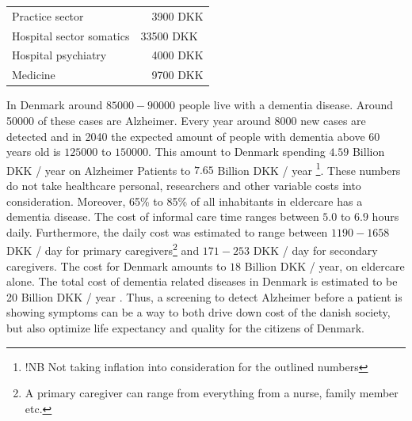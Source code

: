 \documentclass[12pt, fleqn, titlepage]{article}
\begin{document}
		
		\begin{table}[H]
			\begin{tabular}{ll}
				Practice sector   &\ \ 3900  DKK  \\
				Hospital sector somatics  & 33500 DKK \\
				Hospital psychiatry  &  \ \ 4000  DKK  \\
				Medicine & \ \ 9700  DKK 
			\end{tabular}
		\end{table}
		
		In Denmark around $ 85000-90000 $ people live with a dementia disease. Around 50000 of these cases are Alzheimer. Every year around $ 8000 $ new cases are detected and in 2040 the expected amount of people with dementia above 60 years old is $ 125000 $ to $ 150000 $. This amount to Denmark spending $ 4.59 $ Billion DKK / year on Alzheimer Patients to $ 7.65 $ Billion DKK / year \footnote{!NB Not taking inflation into consideration for the outlined numbers}. These numbers do not take healthcare personal, researchers and other variable costs into consideration. Moreover, 65\% to 85\% of all inhabitants in eldercare has a dementia disease. The cost of informal care time ranges between $ 5.0 $ to $ 6.9 $ hours daily. Furthermore, the daily cost was estimated to range between $ 1190 - 1658 $ DKK / day for primary caregivers\footnote{A primary caregiver can range from everything from a nurse, family member etc.} and $ 171 - 253 $ DKK / day for secondary caregivers. The cost for Denmark amounts to $ 18 $ Billion DKK / year, on eldercare alone. The total cost of dementia related diseases in Denmark is estimated to be 20 Billion DKK / year \cite{Alzheimerforeningen} \cite{informal_care}. Thus, a screening to detect Alzheimer before a patient is showing symptoms can be a way to both drive down cost of the danish society, but also optimize life expectancy and quality for the citizens of Denmark.
		
\end{document}

